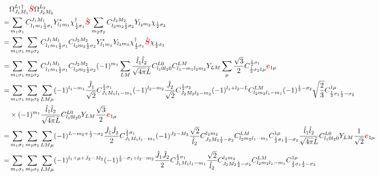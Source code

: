 \documentclass[a4paper]{article}
\newcommand{\no}{\nonumber}
\newcommand{\bmm}[1]{{\color{red}\bm{#1}}}
\begin{document}
\begin{align}
\no&\Omega_{J_{1}M_{1}}^{L_{1}\dag}\hat{\bmm{S}}\Omega_{J_{2}M_{2}}^{L_{2}}\\
\no=&\sum_{m_{1}\sigma_{1}}C_{l_{1}m_{1}\frac{1}{2}\sigma_{1}}^{J_{1}M_{1}}Y_{l_{1}m_{1}}^{*}\chi_{\frac{1}{2}\sigma_{1}}^{\dag}\hat{\bmm{S}}\sum_{m_{2}\sigma_{2}}C_{l_{2}m_{2}\frac{1}{2}\sigma_{2}}^{J_{2}M_{2}}Y_{l_{2}m_{2}}\chi_{\frac{1}{2}\sigma_{2}}\\
\no=&\sum_{m_{1}\sigma_{1}}\sum_{m_{2}\sigma_{2}}C_{l_{1}m_{1}\frac{1}{2}\sigma_{1}}^{J_{1}M_{1}}C_{l_{2}m_{2}\frac{1}{2}\sigma_{2}}^{J_{2}M_{2}}Y_{l_{1}m_{1}}^{*}Y_{l_{2}m_{2}}\chi_{\frac{1}{2}\sigma_{1}}^{\dag}\hat{\bmm{S}}\chi_{\frac{1}{2}\sigma_{2}}\\
\no=&\sum_{m_{1}\sigma_{1}}\sum_{m_{2}\sigma_{2}}C_{l_{1}m_{1}\frac{1}{2}\sigma_{1}}^{J_{1}M_{1}}C_{l_{2}m_{2}\frac{1}{2}\sigma_{2}}^{J_{2}M_{2}}(-1)^{m_{1}}\sum_{LM}\frac{\hat{l}_{1}\hat{l}_{2}}{\sqrt{4\pi} \hat{L}}C_{l_{1}0l_{2}0}^{L0}C_{l_{1}-m_{1}l_{2}m_{2}}^{LM}Y_{LM}\sum_{\mu}\frac{\sqrt{3}}{2}C_{\frac{1}{2}\sigma_{2}1\mu}^{\frac{1}{2}\sigma_{1}}\bmm{e}_{1\mu}\\
\no=&\sum_{m_{1}\sigma_{1}}\sum_{m_{2}\sigma_{2}}\sum_{LM\mu}(-1)^{l_{1}-m_{1}}\frac{\hat{J}_{1}}{\sqrt{2}}C_{J_{1}M_{1}l_{1}-m_{1}}^{\frac{1}{2}\sigma_{1}}(-1)^{l_{2}-m_{2}}\frac{\hat{J}_{2}}{\sqrt{2}}C_{J_{2}M_{2}l_{2}-m_{2}}^{\frac{1}{2}\sigma_{2}}(-1)^{l_{1}+l_{2}-L}C_{l_{2}m_{2}l_{1}-m_{1}}^{LM}(-1)^{\frac{1}{2}-\sigma_{2}}\sqrt{\frac{2}{3}}C_{\frac{1}{2}\sigma_{1}\frac{1}{2}-\sigma_{2}}^{1\mu}\\
\no&\times(-1)^{m_{1}}\frac{\hat{l}_{1}\hat{l}_{2}}{\sqrt{4\pi}\hat{L}}C_{l_{1}0l_{2}0}^{L0}Y_{LM}\frac{\sqrt{3}}{2}\bmm{e}_{1\mu}\\
\no=&\sum_{m_{1}\sigma_{1}}\sum_{m_{2}\sigma_{2}}\sum_{LM\mu}(-1)^{L-m_{2}+\frac{1}{2}-\sigma_{2}}\frac{\hat{J}_{1}\hat{J}_{2}}{2}C_{J_{1}M_{1}l_{1}-m_{1}}^{\frac{1}{2}\sigma_{1}}(-1)^{J_{2}-M_{2}}\frac{\sqrt{2}}{\hat{l}_{2}}C_{J_{2}M_{2}\frac{1}{2}-\sigma_{2}}^{l_{2}m_{2}}C_{l_{2}m_{2}l_{1}-m_{1}}^{LM}C_{\frac{1}{2}\sigma_{1}\frac{1}{2}-\sigma_{2}}^{1\mu}\frac{\hat{l}_{1}\hat{l}_{2}}{\sqrt{4\pi}\hat{L}}C_{l_{1}0l_{2}0}^{L0}Y_{LM}\frac{1}{\sqrt{2}}\bmm{e}_{1\mu}\\
\no=&\sum_{m_{1}\sigma_{1}}\sum_{m_{2}\sigma_{2}}\sum_{LM\mu}(-1)^{l_{1}+\mu+J_{2}-M_{2}}(-1)^{\frac{1}{2}-\sigma_{1}+l_{2}-m_{2}}\frac{\hat{J}_{1}\hat{J}_{2}}{2}C_{J_{1}M_{1}l_{1}-m_{1}}^{\frac{1}{2}\sigma_{1}}\frac{\sqrt{2}}{\hat{l}_{2}}C_{J_{2}M_{2}\frac{1}{2}-\sigma_{2}}^{l_{2}m_{2}}C_{l_{2}m_{2}l_{1}-m_{1}}^{LM}C_{\frac{1}{2}\sigma_{1}\frac{1}{2}-\sigma_{2}}^{1\mu}\\

\end{align}
\end{document}

